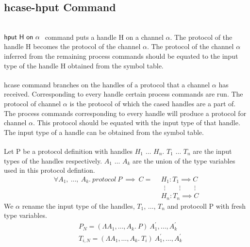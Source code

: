 \documentclass[11pt]{article}
\newcommand{\hput}{\ensuremath{{\sf hput ~ H ~ on ~\alpha~}}\xspace}
\begin{document}
\subsection {hcase-hput Command}
~~\\
$\hput$ command puts a handle H on a channel $\alpha$. The protocol of the handle H becomes the protocol of the channel $\alpha$. The protocol of the channel $\alpha$ inferred from the remaining process commands should be equated to the input type of the handle H obtained from the symbol table. 
~~\\~~\\
{\sf hcase} command branches on the handles of a protocol that a channel $\alpha$ has received. Corresponding to every handle certain process commands are run. The protocol of channel $\alpha$ is the protocol of which the cased handles are a part of. The process commands corresponding to every handle will produce a protocol for channel $\alpha$. This protocol should be equated with the input type of that handle. The input type of a handle can be obtained from the symbol table. 
~~\\~~\\
Let P be  a protocol definition with handles $H_1$ $\ldots$ $H_n$. $T_1$ $\ldots$ $T_n$ are the input types of the handles respectively. $A_1$ $\ldots$ $A_k$ are the union of the type variables used in this protocol defintion.
\begin{align*} 
\forall A_1,~ \ldots,~A_k.~protocol~ P ~\implies~ C =
 & ~~ H_1 : T_{1} \implies C \\
 & ~~~~ \vdots \qquad \vdots \qquad \vdots \\ 
 & ~~ H_n : T_{n} \implies C 
\end{align*}
We $\alpha$ rename the input type of the handles, $T_1$, $\ldots$, $T_n$ and protocoll P with fresh type variables.
\begin{align*} 
 & ~~ P_N = (\Lambda A_1,\ldots,A_k.~P)~A_1^{\prime},\ldots,A_k^{\prime} \\
 & ~~ T_{i,N} = (\Lambda A_1,\ldots,A_k.~ T_{i})~A_1^{\prime},\ldots,A_k^{\prime} \\
\end{align*}
\end{document}
